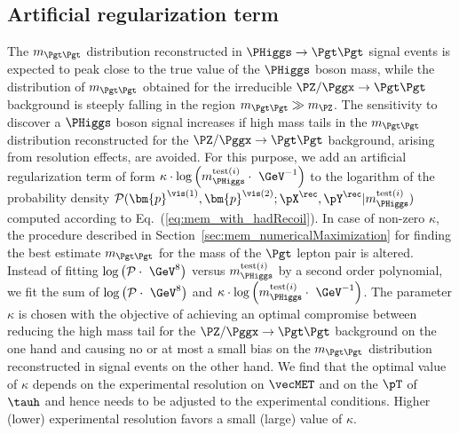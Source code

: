\subsection{Artificial regularization term}
\label{sec:mem_logM}

The $m_{\Pgt\Pgt}$ distribution reconstructed in $\PHiggs \to \Pgt\Pgt$ signal events is expected to peak close to the true value of the $\PHiggs$ boson mass,
while the distribution of $m_{\Pgt\Pgt}$ obtained for the irreducible
$\PZ/\Pggx \to \Pgt\Pgt$ background is steeply falling in the region
$m_{\Pgt\Pgt} \gg m_{\PZ}$.
The sensitivity to discover a $\PHiggs$ boson signal increases if high mass tails in the $m_{\Pgt\Pgt}$ distribution reconstructed 
for the $\PZ/\Pggx \to \Pgt\Pgt$ background, arising from resolution effects, are avoided.
For this purpose,
we add an artificial regularization term of form 
$\kappa \cdot \log \left( m_{\PHiggs}^{\textrm{test}(i)} \cdot \mbox{~\GeV}^{-1} \right)$ 
to the logarithm of the probability density $\mathcal{P}(\bm{p}^{\vis(1)},\bm{p}^{\vis(2)};\pX^{\rec},\pY^{\rec}|m_{\PHiggs}^{\textrm{test}(i)})$
computed according to Eq.~(\ref{eq:mem_with_hadRecoil}).
In case of non-zero $\kappa$,
the procedure described in Section~\ref{sec:mem_numericalMaximization} for finding the best estimate $m_{\Pgt\Pgt}$ for the mass of the $\Pgt$ lepton pair is altered.
Instead of fitting 
$\log \left( \mathcal{P} \cdot \mbox{~\GeV}^{8} \right)$ 
versus $m_{\PHiggs}^{\textrm{test}(i)}$ by a second order polynomial,
we fit the sum of $\log \left( \mathcal{P} \cdot \mbox{~\GeV}^{8} \right)$
and $\kappa \cdot \log \left( m_{\PHiggs}^{\textrm{test}(i)} \cdot \mbox{~\GeV}^{-1} \right)$.
The parameter $\kappa$ is chosen with the objective of achieving an
optimal compromise between reducing the high mass tail for the
$\PZ/\Pggx \to \Pgt\Pgt$ background on the one hand and 
causing no or at most a small bias on the $m_{\Pgt\Pgt}$ distribution
reconstructed in signal events on the other hand.
We find that the optimal value of $\kappa$ depends on the experimental
resolution on $\vecMET$ and on the $\pT$ of $\tauh$ and hence needs to be adjusted to the experimental conditions.
Higher (lower) experimental resolution favors a small (large) value of $\kappa$. 
